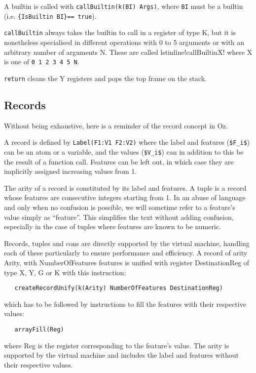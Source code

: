 \documentclass[a4paper]{memoir}
\begin{document}
A builtin is called with \lstinline!callBuiltin(k(BI) Args)!, where
\lstinline!BI! must be a builtin (i.e. \lstinline!{IsBuiltin BI}== true!).

\lstinline!callBuiltin! always takes the builtin to call in a register of type
K, but it is nonetheless specialised in different operations with 0 to 5
arguments or with an arbitrary number of arguments N. These are called
lstinline!callBuiltinX! where X is one of \lstinline!0 1 2 3 4 5 N!.

\lstinline!return! cleans the Y registers and pops the top frame on the stack.


\subsection{Records}\label{sec:opcode:records}
Without being exhaustive, here is a reminder of the record concept in Oz. 

A record is defined by \lstinline!Label(F1:V1 F2:V2)! where the label and features
(\lstinline[mathescape]!$F_i$!) can be an atom or a variable, and the values
(\lstinline[mathescape]!$V_i$!) can in addition to this be the result of a function call. Features can be left out, in which case they are implicitly assigned increasing values from 1.

The arity of a record is constituted by its label and features.
A tuple is a record whose features are consecutive integers starting from 1. 
In an abuse of language and only when no confusion is possible, we will
sometime refer to a feature's value simply as ``feature''. This simplifies the
text without adding confusion, especially in the case of tuples where features
are known to be numeric.

Records, tuples and cons are directly supported by the virtual machine, handling each of these particularly to ensure performance and efficiency.
A record of arity Arity, with NumberOfFeatures features is unified with register
DestinationReg of type X, Y, G or K with this instruction:
\begin{lstlisting}
   createRecordUnify(k(Arity) NumberOfFeatures DestinationReg)
\end{lstlisting}
which has to be followed by instructions to fill the features with their respective values:
\begin{lstlisting}
   arrayFill(Reg)
\end{lstlisting}
 where Reg is the register corresponding to the feature's value.
The arity is supported by the virtual machine and includes the label and features without their respective values.
\end{document}

